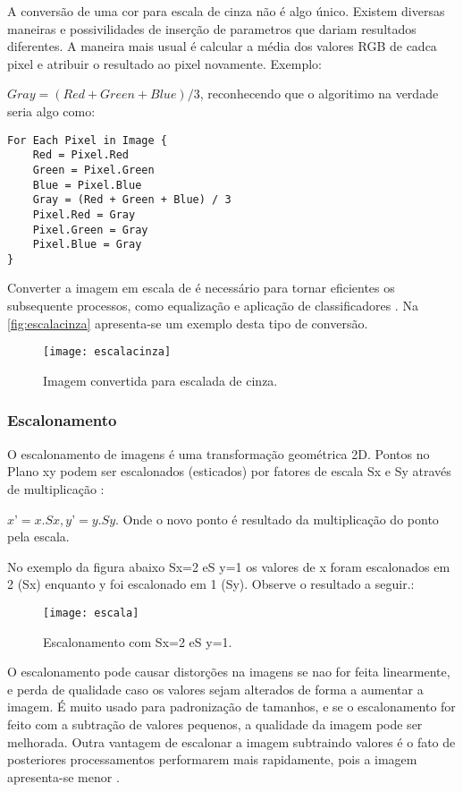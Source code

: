 A conversão de uma cor para escala de cinza não é algo único. Existem diversas maneiras e possivilidades de inserção de parametros que dariam resultados diferentes. A maneira mais usual é calcular a média dos valores RGB de cadca pixel e atribuir o resultado ao pixel novamente. Exemplo:

$ Gray = (Red + Green + Blue) / 3 $, reconhecendo que o algoritimo na verdade seria algo como:

\begin{lstlisting}
For Each Pixel in Image {
	Red = Pixel.Red
	Green = Pixel.Green
	Blue = Pixel.Blue
	Gray = (Red + Green + Blue) / 3	
	Pixel.Red = Gray
	Pixel.Green = Gray
	Pixel.Blue = Gray
}
\end{lstlisting}



Converter a imagem em escala de é necessário para tornar eficientes os subsequente processos, como equalização e aplicação de classificadores \cite{drmathew_java_programming}. Na \autoref{fig:escalacinza} apresenta-se um exemplo desta tipo de conversão.

\begin{figure}[h]
	\centering
	\texttt{[image: escalacinza]}
	\caption{Imagem convertida para escalada de cinza.}
	\label{fig:escalacinza}
\end{figure}

\subsubsection{Escalonamento}\label{subsubsec:escalonamento}

O escalonamento de imagens é uma transformação geométrica 2D. Pontos no Plano xy podem ser escalonados (esticados) por fatores de escala Sx e Sy através de multiplicação \cite{lapix_escala}:

$ x’ = x . Sx, y’ = y . Sy $.
Onde o novo ponto é resultado da multiplicação do ponto pela escala.

No exemplo da figura abaixo Sx=2 eS y=1 os valores de x foram escalonados em 2 (Sx) enquanto y foi escalonado em 1 (Sy). Observe o resultado a seguir.:

\begin{figure}[h]
	\centering
	\texttt{[image: escala]}
	\caption{Escalonamento com Sx=2 eS y=1.}
	\label{fig:escala}
\end{figure}

O escalonamento pode causar distorções na imagens se nao for feita linearmente, e perda de qualidade caso os valores sejam alterados de forma a aumentar a imagem. É muito usado para padronização de tamanhos, e se o escalonamento for feito com a subtração de valores pequenos, a qualidade da imagem pode ser melhorada. Outra vantagem de escalonar a imagem subtraindo valores é o fato de posteriores processamentos performarem mais rapidamente, pois a imagem apresenta-se menor \cite{drmathew_java_programming}. 



